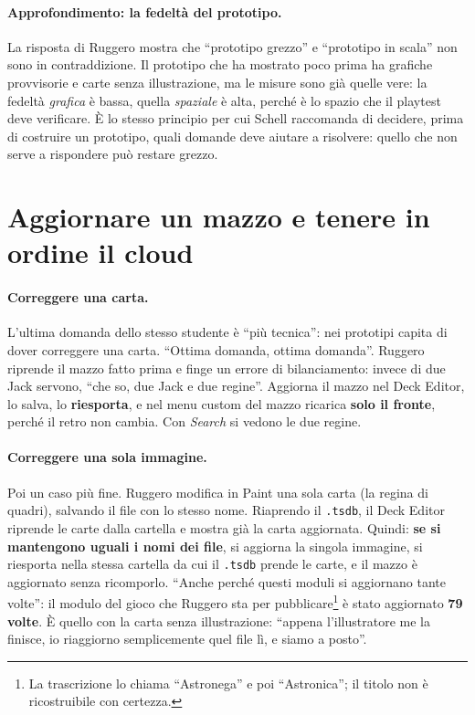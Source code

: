 \paragraph{Approfondimento: la fedeltà del prototipo.} La risposta di Ruggero mostra
che ``prototipo grezzo'' e ``prototipo in scala'' non sono in contraddizione. Il
prototipo che ha mostrato poco prima ha grafiche provvisorie e carte senza
illustrazione, ma le misure sono già quelle vere: la fedeltà \emph{grafica} è bassa,
quella \emph{spaziale} è alta, perché è lo spazio che il playtest deve verificare.
È lo stesso principio per cui Schell raccomanda di decidere, prima di costruire un
prototipo, quali domande deve aiutare a risolvere: quello che non serve a rispondere
può restare grezzo.

\section{Aggiornare un mazzo e tenere in ordine il cloud}
\label{a8:sec:aggiornare}

\paragraph{Correggere una carta.} L'ultima domanda dello stesso studente è ``più
tecnica'': nei prototipi capita di dover correggere una carta. ``Ottima domanda, ottima
domanda''. Ruggero riprende il mazzo fatto prima e finge un errore di bilanciamento:
invece di due Jack servono, ``che so, due Jack e due regine''. Aggiorna il mazzo nel
Deck Editor, lo salva, lo \textbf{riesporta}, e nel menu custom del mazzo ricarica
\textbf{solo il fronte}, perché il retro non cambia. Con \emph{Search} si vedono le due
regine.

\paragraph{Correggere una sola immagine.} Poi un caso più fine. Ruggero modifica in Paint
una sola carta (la regina di quadri), salvando il file con lo stesso nome. Riaprendo il
\texttt{.tsdb}, il Deck Editor riprende le carte dalla cartella e mostra già la carta
aggiornata. Quindi: \textbf{se si mantengono uguali i nomi dei file}, si aggiorna la
singola immagine, si riesporta nella stessa cartella da cui il \texttt{.tsdb} prende le
carte, e il mazzo è aggiornato senza ricomporlo. ``Anche perché questi moduli si
aggiornano tante volte'': il modulo del gioco che Ruggero sta per pubblicare\footnote{La
trascrizione lo chiama ``Astronega'' e poi ``Astronica''; il titolo non è
ricostruibile con certezza.} è stato aggiornato \textbf{79 volte}. È quello con la
carta senza illustrazione: ``appena l'illustratore me la finisce, io riaggiorno
semplicemente quel file lì, e siamo a posto''.

